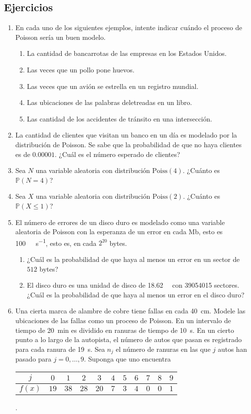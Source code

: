 \subsection{Ejercicios}

\begin{enumerate}
	\item En cada uno de los siguientes ejemplos, intente indicar cuándo el proceso de Poisson sería un buen modelo.
	\begin{enumerate}
		\item La cantidad de bancarrotas de las empresas en los Estados Unidos.
		\item Las  veces que un pollo pone huevos.
		\item Las veces que un avión se estrella en un registro mundial.
		\item Las ubicaciones de las palabras deletreadas en un libro.
		\item Las cantidad de los accidentes de tránsito en una intersección.
	\end{enumerate}
	\item La cantidad de clientes que visitan un banco en un día es modelado por la distribución de Poisson. Se sabe que la probabilidad de que no haya clientes es de $0.00001$. ¿Cuál es el número esperado de clientes?
	\item Sea $N$ una variable aleatoria con distribución $\mathrm{Poiss}(4)$. ¿Cuánto es $\mathds{P}\left(N=4\right)$?
	\item Sea $X$ una variable aleatoria con distribución $\mathrm{Poiss}(2)$. ¿Cuánto es $\mathds{P}\left(X\le1\right)$?
	\item El número de errores de un disco duro es modelado como una variable aleatoria de Poisson con la esperanza de un error en cada Mb, esto es \SI{100}{\mega\byte\per\second}, esto es, en cada $2^{20}$ bytes.
	\begin{enumerate}
		\item ¿Cuál es la probabilidad de que haya al menos un error en un sector de $512$ bytes?
		\item El disco duro es una unidad de disco de \SI{18.62}{\giga\byte} con \num{39054015} sectores. ¿Cuál es la probabilidad de que haya al menos un error en el disco duro?
	\end{enumerate}
	\item Una cierta marca de alambre de cobre tiene fallas en cada \SI{40}{\centi\metre}. Modele las  ubicaciones de las fallas como un proceso de Poisson. En un intervalo de tiempo de \SI{20}{\minute} es dividido en ranuras de tiempo de \SI{10}{\second}. En un cierto punto a lo largo de la autopista, el número de autos que pasan es registrado para cada ranura de \SI{19}{\second}. Sea $n_j$ el número de ranuras en las que $j$ autos han pasado para $j=0,\ldots,9$. Suponga que uno encuentra
	\centering
	\begin{tabular}{c|cccccccccc}
		$j$ 	& $0$ & $1$ & $2$ & $3$ & $4$ & $5$ & $6$ & $7$ & $8$ & $9$ \\
		\hline
		$f(x)$& $19$ & $38$ & $28$ & $20$ & $7$ & $3$ & $4$ & $0$ & $0$ & $1$
	\end{tabular}\quad.


\end{enumerate}
